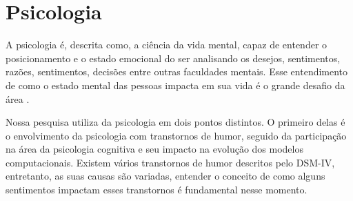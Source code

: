 \section{Psicologia}

A psicologia é, descrita como, a ciência da vida mental, capaz de entender o posicionamento e o estado emocional do ser analisando os desejos, sentimentos, razões, sentimentos, decisões entre outras faculdades mentais. Esse entendimento de como o estado mental das pessoas impacta em sua vida é o grande desafio da área \cite[4-8]{william1890principles}.

Nossa pesquisa utiliza da psicologia em dois pontos distintos. O primeiro delas é o envolvimento da psicologia com transtornos de humor, seguido da participação na área da psicologia cognitiva e seu impacto na evolução dos modelos computacionais. Existem vários transtornos de humor descritos pelo DSM-IV, entretanto, as suas causas são variadas, entender o conceito de como alguns sentimentos impactam esses transtornos é fundamental nesse momento.




